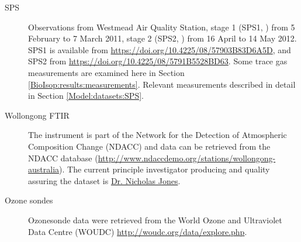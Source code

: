 \begin{description}
    
    \item[SPS] Observations from Westmead Air Quality Station, stage 1 (SPS1, \textcite{SPS12016}) from 5 February to 7 March 2011, stage 2 (SPS2, \textcite{SPS22016})  from 16 April to 14 May 2012.
    SPS1 is available from \url{https://doi.org/10.4225/08/57903B83D6A5D}, and SPS2 from \url{https://doi.org/10.4225/08/5791B5528BD63}.
    Some trace gas measurements are examined here in Section \ref{BioIsop:results:measurements}.
    Relevant measurements described in detail in Section \ref{Model:datasets:SPS}.
    
    \item[Wollongong FTIR] The instrument is part of the Network for the Detection of Atmospheric Composition Change (NDACC) and data can be retrieved from the NDACC database (\url{http://www.ndaccdemo.org/stations/wollongong-australia}).
    The current principle investigator producing and quality assuring the dataset is \href{mailto:njones@uow.edu.au}{Dr. Nicholas Jones}.
    
    \item[Ozone sondes] Ozonesonde data were retrieved from the World Ozone and Ultraviolet Data Centre (WOUDC)  \url{http://woudc.org/data/explore.php}.
    
    
    
  \end{description}